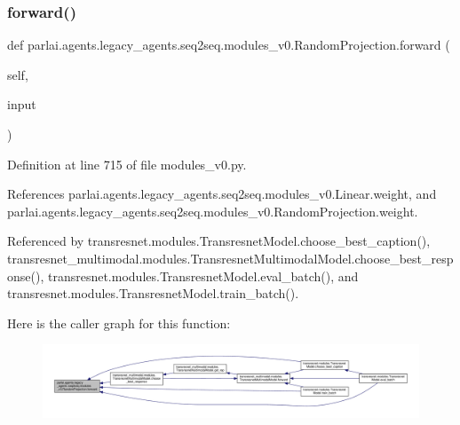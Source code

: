\subsubsection{\texorpdfstring{forward()}{forward()}}
{\footnotesize\ttfamily def parlai.\+agents.\+legacy\+\_\+agents.\+seq2seq.\+modules\+\_\+v0.\+Random\+Projection.\+forward (\begin{DoxyParamCaption}\item[{}]{self,  }\item[{}]{input }\end{DoxyParamCaption})}



Definition at line 715 of file modules\+\_\+v0.\+py.



References parlai.\+agents.\+legacy\+\_\+agents.\+seq2seq.\+modules\+\_\+v0.\+Linear.\+weight, and parlai.\+agents.\+legacy\+\_\+agents.\+seq2seq.\+modules\+\_\+v0.\+Random\+Projection.\+weight.



Referenced by transresnet.\+modules.\+Transresnet\+Model.\+choose\+\_\+best\+\_\+caption(), transresnet\+\_\+multimodal.\+modules.\+Transresnet\+Multimodal\+Model.\+choose\+\_\+best\+\_\+response(), transresnet.\+modules.\+Transresnet\+Model.\+eval\+\_\+batch(), and transresnet.\+modules.\+Transresnet\+Model.\+train\+\_\+batch().

Here is the caller graph for this function\+:
\nopagebreak
\begin{figure}[H]
\begin{center}
\leavevmode
\includegraphics[width=350pt]{classparlai_1_1agents_1_1legacy__agents_1_1seq2seq_1_1modules__v0_1_1RandomProjection_aa827034c53df417f2eedac25f581a88d_icgraph}
\end{center}
\end{figure}
\mbox{\label{classparlai_1_1agents_1_1legacy__agents_1_1seq2seq_1_1modules__v0_1_1RandomProjection_a8658f06bff792a0c09d106950a6267fe}} 
